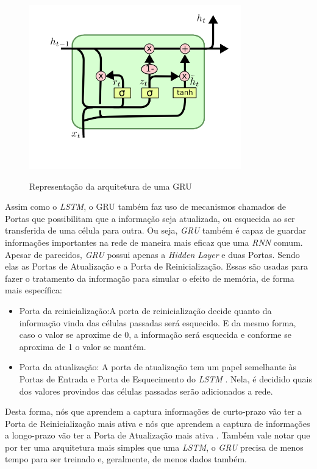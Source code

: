 \begin{figure}[htbp]
    \centering
    \includegraphics[scale=0.8]{monography/img/models/GRU.png}
    \label{figure:gru}
    \caption[Representação da arquitetura de uma GRU]{Representação da arquitetura de uma GRU\footnotemark}
\end{figure}

Assim como o \textit{\acrshort{LSTM}}, o \acrshort{GRU} também faz uso de mecanismos chamados de Portas que possibilitam que a informação seja atualizada, ou esquecida ao ser transferida de uma célula para outra. Ou seja, \textit{\acrshort{GRU}} também é capaz de guardar informações importantes na rede de maneira mais eficaz que uma \textit{\acrshort{RNN}} comum. Apesar de parecidos, \textit{\acrshort{GRU}} possui apenas a \textit{Hidden Layer} e duas Portas. Sendo elas as Portas de Atualização e a Porta de Reinicialização. Essas são usadas para fazer o tratamento da informação para simular o efeito de memória, de forma mais específica:

\begin{itemize}
    \item Porta da reinicialização:A porta de reinicialização decide quanto da informação vinda das células passadas será esquecido. E da mesmo forma, caso o valor se aproxime de 0, a informação será esquecida e conforme se aproxima de 1 o valor se mantém.
    
    \item Porta da atualização: A porta de atualização tem um papel semelhante às Portas de Entrada e Porta de Esquecimento do \textit{\acrshort{LSTM}} . Nela, é decidido quais dos valores provindos das células passadas serão adicionados a rede.
\end{itemize}

Desta forma, nós que aprendem a captura informações de curto-prazo vão ter a Porta de Reinicialização mais ativa e nós que aprendem a captura de informações a longo-prazo vão ter a Porta de Atualização mais ativa \cite{cho2014}. Também vale notar que por ter uma arquitetura mais simples que uma \textit{\acrshort{LSTM}}, o \textit{\acrshort{GRU}} precisa de menos tempo para ser treinado e, geralmente, de menos dados também.
